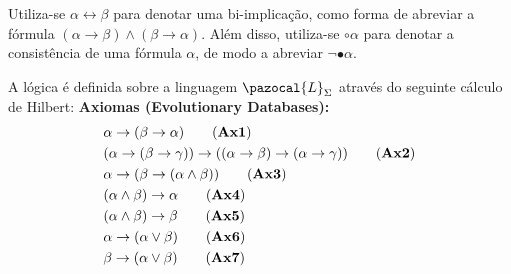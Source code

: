
\begin{notacao}
    Utiliza-se $\alpha \leftrightarrow \beta$ para denotar uma bi-implicação, como forma de abreviar a fórmula $(\alpha \rightarrow \beta) \land (\beta \rightarrow \alpha)$. Além disso, utiliza-se $\circ \alpha$ para denotar a consistência de uma fórmula $\alpha$, de modo a abreviar $\neg \bullet \alpha$.
\end{notacao}

\begin{definicao}[\lfium{}]
    \label{def:lfi1}
    A lógica \lfium{} é definida sobre a linguagem $\pazocal{L}_{\Sigma}$ através do seguinte cálculo de Hilbert:
    \noindent\textbf{Axiomas (Evolutionary Databases):}
    \begin{align*}
         & \alpha \rightarrow (\beta \rightarrow \alpha)\tag{\textbf{Ax1}}                                                                                     \\
         & (\alpha \rightarrow (\beta \rightarrow \gamma)) \rightarrow ((\alpha \rightarrow \beta) \rightarrow (\alpha \rightarrow \gamma ))\tag{\textbf{Ax2}} \\
         & \alpha \rightarrow (\beta \rightarrow (\alpha \land \beta))\tag{\textbf{Ax3}}                                                                       \\
         & (\alpha \land \beta) \rightarrow \alpha\tag{\textbf{Ax4}}                                                                                           \\
         & (\alpha \land \beta) \rightarrow \beta\tag{\textbf{Ax5}}                                                                                            \\
         & \alpha \rightarrow (\alpha \lor \beta)\tag{\textbf{Ax6}}                                                                                            \\
         & \beta \rightarrow (\alpha \lor \beta)\tag{\textbf{Ax7}}                                                                                             \\

\end{align*}
\end{definicao}
